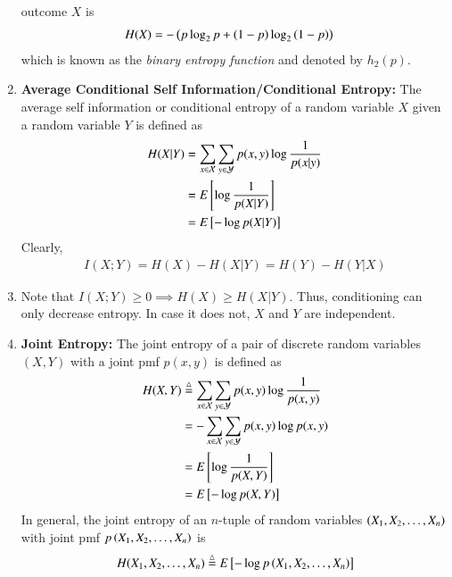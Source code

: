\documentclass[journal,12pt,twocolumn]{IEEEtran}
\renewcommand\thesection{\arabic{section}}
\begin{document}
\begin{enumerate}[label=\thesection.\arabic*, ref=\thesection.\theenumi]
    outcome $X$ is
    \begin{align}
        H(X) &= -\left(p\log_2p + (1 - p)\log_2\left(1 - p\right)\right)
        \label{eq:bin-entropy-func}
    \end{align}
    which is known as the \textit{binary entropy function} and denoted by 
    $h_2(p)$.
    \item \textbf{Average Conditional Self Information/Conditional Entropy:}
    The average self information or conditional entropy of a random variable 
    $X$ given a random variable $Y$ is defined as
    \begin{align}
        H(X|Y) &= \sum_{x\in\mathcal{X}}\sum_{y\in\mathcal{Y}}p(x,y)\log\frac{1}{p(x|y)} \label{eq:cond-entropy-1} \\
        &= E{}\left[\log\frac{1}{p(X|Y)}\right] \label{eq:cond-entropy-2} \\
        &= E{}\left[-\log p(X|Y)\right] \label{eq:cond-entropy-3}
    \end{align}
    Clearly,
    \begin{align}
        I(X;Y) = H(X) - H(X|Y) = H(Y) - H(Y|X)
        \label{eq:cond-mutual-self-entropy}
    \end{align}
    \item Note that $I(X;Y) \ge 0 \implies H(X) \ge H(X|Y)$. Thus, conditioning 
    can only decrease entropy. In case it does not, $X$ and $Y$ are 
    independent.
    \item \textbf{Joint Entropy:} The joint entropy of a pair of discrete random
    variables $(X,Y)$ with a joint pmf $p(x,y)$ is defined as
    \begin{align}
        H(X,Y) &\stackrel{\triangle}{=} \sum_{x\in\mathcal{X}}\sum_{y\in\mathcal{Y}}p(x,y)\log\frac{1}{p(x,y)} \label{eq:joint-entropy-1} \\
        &= -\sum_{x\in\mathcal{X}}\sum_{y\in\mathcal{Y}}p(x,y)\log{p(x,y)} \label{eq:joint-entropy-2} \\
        &= E{}\left[\log\frac{1}{p(X,Y)}\right] \label{eq:joint-entropy-3} \\
        &= E{}\left[-\log{p(X,Y)}\right] \label{eq:joint-entropy-4}
    \end{align}
    In general, the joint entropy of an $n$-tuple of random variables 
    $\left(X_1, X_2, \ldots, X_n\right)$ with joint pmf $p\left(X_1,X_2,\ldots,X_n\right)$ 
    is 
    \begin{align}
        H(X_1,X_2,\ldots,X_n) \stackrel{\triangle}{=} E{}\left[-\log{p\ensuremath{\left(X_1,X_2,\ldots,X_n\right)}}\right]
        \label{eq:joint-entropy-gen}
    \end{align}

\end{enumerate}
\end{document}
